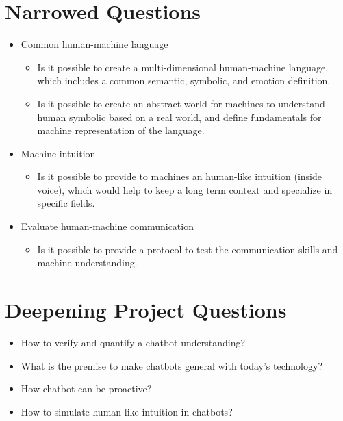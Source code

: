 \section{Narrowed Questions}
\begin{itemize}
    \item Common human-machine language
    \begin{itemize}[noitemsep]
        \item Is it possible to create a multi-dimensional human-machine language, which includes a common semantic, symbolic, and emotion definition.
        \item Is it possible to create an abstract world for machines to understand human symbolic based on a real world, and define fundamentals for machine representation of the language.
    \end{itemize}
    \item Machine intuition
    \begin{itemize}[noitemsep]
        \item Is it possible to provide to machines an human-like intuition (inside voice), which would help to keep a long term context and specialize in specific fields.
    \end{itemize}
    \item Evaluate human-machine communication
    \begin{itemize}[noitemsep]
        \item Is it possible to provide a protocol to test the communication skills and machine understanding.
    \end{itemize}
\end{itemize}


\section{Deepening Project Questions}
\begin{itemize}[noitemsep]
    \item How to verify and quantify a chatbot understanding?
    \item What is the premise to make chatbots general with today's technology?
    \item How chatbot can be proactive?
    \item How to simulate human-like intuition in chatbots?
\end{itemize}
